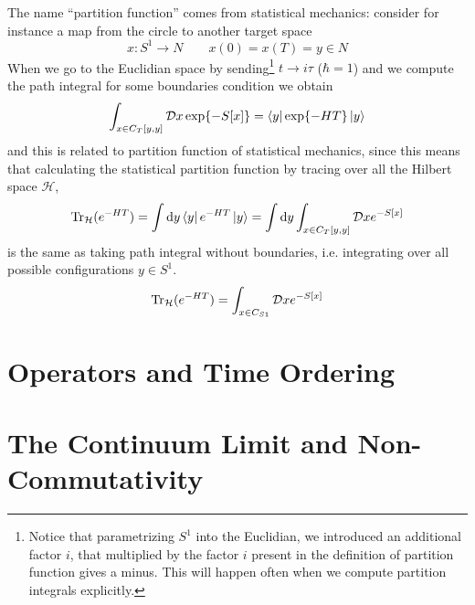 \documentclass[../main/main.tex]{subfiles}
\begin{document}
The name ``partition function'' comes from statistical mechanics: consider for instance a map from the circle to another target space
\[x:S^1\to N\qquad x(0)=x(T)=y\in N\]
When we go to the Euclidian space by sending\footnote{Notice that parametrizing $S^1$ into the Euclidian, we introduced an additional factor $i$, that multiplied by the factor $i$ present in the definition of partition function gives a minus. This will happen often when we compute partition integrals explicitly.} $t\to i\tau$ ($\hbar =1$) and we compute the path integral for some boundaries condition we obtain
\[\int_{x\in C_T[y,y]}\mathcal Dx \exp{-S[x]}=\bra{y}\exp{-HT}\ket {y}\]
and this is related to partition function of statistical mechanics, since this means that calculating the statistical partition function by tracing over all the Hilbert space $\mathcal H$,
\[\Tr_{\mathcal H}(e^{-HT})=\int \textup{d} y\bra{y}e^{-HT}\ket{y}=\int\textup{d} y\int_{x\in C_T[y,y]}\mathcal D xe^{-S[x]}\]
is the same as taking path integral without boundaries, i.e. integrating over all possible configurations $y\in S^1$. 
\[\Tr_{\mathcal H}(e^{-HT})=\int_{x\in C_{S1}}\mathcal Dxe^{-S[x]}\]




























\section{Operators and Time Ordering}

\section{The Continuum Limit and Non-Commutativity}
\end{document}
